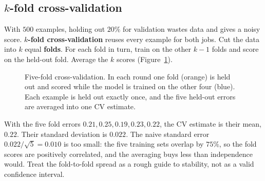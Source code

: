 \subsection{$k$-fold cross-validation}

With $500$ examples, holding out $20\%$ for validation wastes data and gives a noisy score.
\textbf{$k$-fold cross-validation} reuses every example for both jobs. Cut the data into $k$
equal \textbf{folds}. For each fold in turn, train on the other $k-1$ folds and score on the
held-out fold. Average the $k$ scores (Figure~\ref{fig:ml-kfold}).

\begin{figure}[H]
\centering
{}
\caption{Five-fold cross-validation. In each round one fold (orange) is held out and scored
while the model is trained on the other four (blue). Each example is held out exactly once,
and the five held-out errors are averaged into one CV estimate.}
\label{fig:ml-kfold}
\end{figure}

With the five fold errors $0.21, 0.25, 0.19, 0.23, 0.22$, the CV estimate is their mean,
$0.22$. Their standard deviation is $0.022$. The naive standard error $0.022/\sqrt5=0.010$ is
too small: the five training sets overlap by $75\%$, so the fold scores are positively
correlated, and the averaging buys less than independence would. Treat the fold-to-fold spread
as a rough guide to stability, not as a valid confidence interval.

